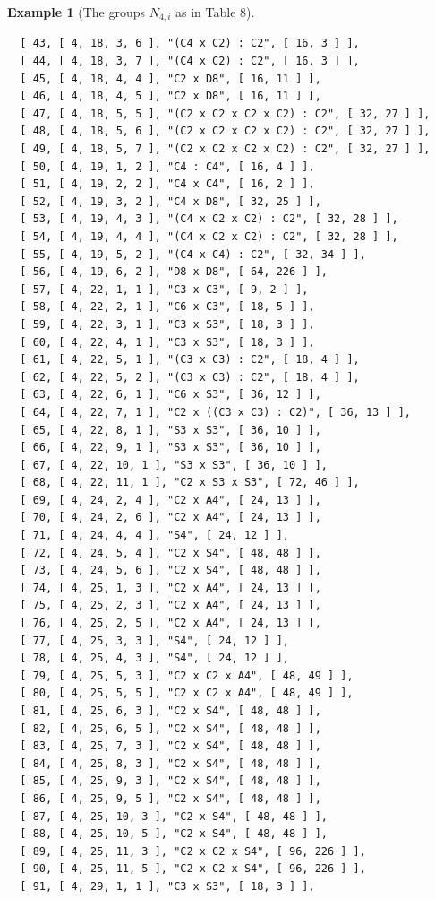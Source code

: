 \documentclass{amsart}
\theoremstyle{plain}
\theoremstyle{definition}
\newtheorem{example}[theorem]{Example}
\theoremstyle{remark}
\begin{document}
\begin{example}[The groups $N_{4,i}$ as in Table $8$]
\begin{verbatim}
  [ 43, [ 4, 18, 3, 6 ], "(C4 x C2) : C2", [ 16, 3 ] ], 
  [ 44, [ 4, 18, 3, 7 ], "(C4 x C2) : C2", [ 16, 3 ] ], 
  [ 45, [ 4, 18, 4, 4 ], "C2 x D8", [ 16, 11 ] ], 
  [ 46, [ 4, 18, 4, 5 ], "C2 x D8", [ 16, 11 ] ], 
  [ 47, [ 4, 18, 5, 5 ], "(C2 x C2 x C2 x C2) : C2", [ 32, 27 ] ], 
  [ 48, [ 4, 18, 5, 6 ], "(C2 x C2 x C2 x C2) : C2", [ 32, 27 ] ], 
  [ 49, [ 4, 18, 5, 7 ], "(C2 x C2 x C2 x C2) : C2", [ 32, 27 ] ], 
  [ 50, [ 4, 19, 1, 2 ], "C4 : C4", [ 16, 4 ] ], 
  [ 51, [ 4, 19, 2, 2 ], "C4 x C4", [ 16, 2 ] ], 
  [ 52, [ 4, 19, 3, 2 ], "C4 x D8", [ 32, 25 ] ], 
  [ 53, [ 4, 19, 4, 3 ], "(C4 x C2 x C2) : C2", [ 32, 28 ] ], 
  [ 54, [ 4, 19, 4, 4 ], "(C4 x C2 x C2) : C2", [ 32, 28 ] ], 
  [ 55, [ 4, 19, 5, 2 ], "(C4 x C4) : C2", [ 32, 34 ] ], 
  [ 56, [ 4, 19, 6, 2 ], "D8 x D8", [ 64, 226 ] ], 
  [ 57, [ 4, 22, 1, 1 ], "C3 x C3", [ 9, 2 ] ], 
  [ 58, [ 4, 22, 2, 1 ], "C6 x C3", [ 18, 5 ] ], 
  [ 59, [ 4, 22, 3, 1 ], "C3 x S3", [ 18, 3 ] ], 
  [ 60, [ 4, 22, 4, 1 ], "C3 x S3", [ 18, 3 ] ], 
  [ 61, [ 4, 22, 5, 1 ], "(C3 x C3) : C2", [ 18, 4 ] ], 
  [ 62, [ 4, 22, 5, 2 ], "(C3 x C3) : C2", [ 18, 4 ] ], 
  [ 63, [ 4, 22, 6, 1 ], "C6 x S3", [ 36, 12 ] ], 
  [ 64, [ 4, 22, 7, 1 ], "C2 x ((C3 x C3) : C2)", [ 36, 13 ] ], 
  [ 65, [ 4, 22, 8, 1 ], "S3 x S3", [ 36, 10 ] ], 
  [ 66, [ 4, 22, 9, 1 ], "S3 x S3", [ 36, 10 ] ], 
  [ 67, [ 4, 22, 10, 1 ], "S3 x S3", [ 36, 10 ] ], 
  [ 68, [ 4, 22, 11, 1 ], "C2 x S3 x S3", [ 72, 46 ] ], 
  [ 69, [ 4, 24, 2, 4 ], "C2 x A4", [ 24, 13 ] ], 
  [ 70, [ 4, 24, 2, 6 ], "C2 x A4", [ 24, 13 ] ], 
  [ 71, [ 4, 24, 4, 4 ], "S4", [ 24, 12 ] ], 
  [ 72, [ 4, 24, 5, 4 ], "C2 x S4", [ 48, 48 ] ], 
  [ 73, [ 4, 24, 5, 6 ], "C2 x S4", [ 48, 48 ] ], 
  [ 74, [ 4, 25, 1, 3 ], "C2 x A4", [ 24, 13 ] ], 
  [ 75, [ 4, 25, 2, 3 ], "C2 x A4", [ 24, 13 ] ], 
  [ 76, [ 4, 25, 2, 5 ], "C2 x A4", [ 24, 13 ] ], 
  [ 77, [ 4, 25, 3, 3 ], "S4", [ 24, 12 ] ], 
  [ 78, [ 4, 25, 4, 3 ], "S4", [ 24, 12 ] ], 
  [ 79, [ 4, 25, 5, 3 ], "C2 x C2 x A4", [ 48, 49 ] ], 
  [ 80, [ 4, 25, 5, 5 ], "C2 x C2 x A4", [ 48, 49 ] ], 
  [ 81, [ 4, 25, 6, 3 ], "C2 x S4", [ 48, 48 ] ], 
  [ 82, [ 4, 25, 6, 5 ], "C2 x S4", [ 48, 48 ] ], 
  [ 83, [ 4, 25, 7, 3 ], "C2 x S4", [ 48, 48 ] ], 
  [ 84, [ 4, 25, 8, 3 ], "C2 x S4", [ 48, 48 ] ], 
  [ 85, [ 4, 25, 9, 3 ], "C2 x S4", [ 48, 48 ] ], 
  [ 86, [ 4, 25, 9, 5 ], "C2 x S4", [ 48, 48 ] ], 
  [ 87, [ 4, 25, 10, 3 ], "C2 x S4", [ 48, 48 ] ], 
  [ 88, [ 4, 25, 10, 5 ], "C2 x S4", [ 48, 48 ] ], 
  [ 89, [ 4, 25, 11, 3 ], "C2 x C2 x S4", [ 96, 226 ] ], 
  [ 90, [ 4, 25, 11, 5 ], "C2 x C2 x S4", [ 96, 226 ] ], 
  [ 91, [ 4, 29, 1, 1 ], "C3 x S3", [ 18, 3 ] ], 

\end{verbatim}
\end{example}
\end{document}
